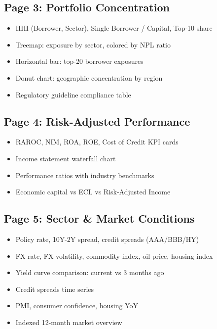 \documentclass[12pt,a4paper]{article}
\begin{document}
\subsection{Page 3: Portfolio Concentration}

\begin{itemize}
    \item HHI (Borrower, Sector), Single Borrower / Capital, Top-10 share
    \item Treemap: exposure by sector, colored by NPL ratio
    \item Horizontal bar: top-20 borrower exposures
    \item Donut chart: geographic concentration by region
    \item Regulatory guideline compliance table
\end{itemize}

\subsection{Page 4: Risk-Adjusted Performance}

\begin{itemize}
    \item RAROC, NIM, ROA, ROE, Cost of Credit KPI cards
    \item Income statement waterfall chart
    \item Performance ratios with industry benchmarks
    \item Economic capital vs ECL vs Risk-Adjusted Income
\end{itemize}

\subsection{Page 5: Sector \& Market Conditions}

\begin{itemize}
    \item Policy rate, 10Y-2Y spread, credit spreads (AAA/BBB/HY)
    \item FX rate, FX volatility, commodity index, oil price, housing index
    \item Yield curve comparison: current vs 3 months ago
    \item Credit spreads time series
    \item PMI, consumer confidence, housing YoY
    \item Indexed 12-month market overview
\end{itemize}
\end{document}

